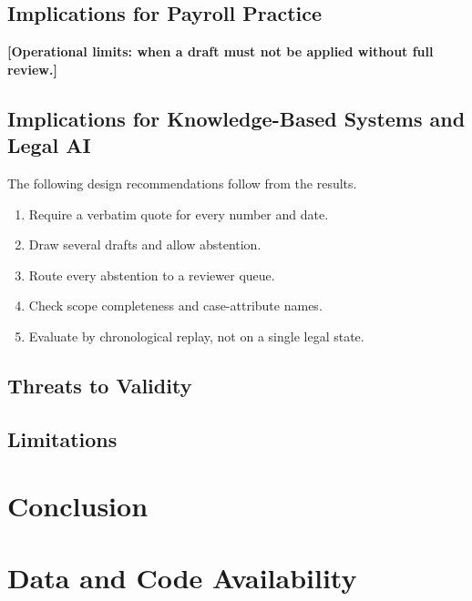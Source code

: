 \documentclass{ieeeaccess}
\begin{document}
\subsection{Implications for Payroll Practice}
\lipsum[80][1-7] \textbf{[Operational limits: when a draft must not be applied without full review.]}
\lipsum[143] %

\subsection{Implications for Knowledge-Based Systems and Legal AI}
\lipsum[81][1-6] The following design recommendations follow from the results.
\begin{enumerate}
\item Require a verbatim quote for every number and date.
\item Draw several drafts and allow abstention.
\item Route every abstention to a reviewer queue.
\item Check scope completeness and case-attribute names.
\item Evaluate by chronological replay, not on a single legal state.
\end{enumerate}
\lipsum[144] %

\subsection{Threats to Validity}
\lipsum[82] \lipsum[83][1-6]
\lipsum[145] %

\subsection{Limitations}
\lipsum[84][1-6]

\lipsum[146] %

\section{Conclusion}
\lipsum[85][1-8]

\lipsum[147] %

\section*{Data and Code Availability}
\lipsum[86][1-4]
\end{document}
